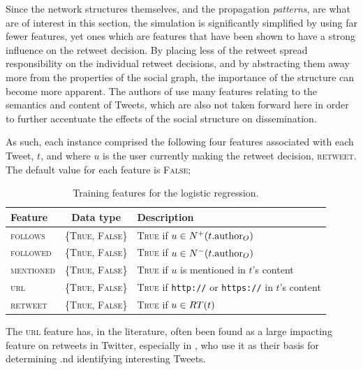 Since the network structures themselves, and the propagation \textit{patterns}, are what are of interest in this section, the simulation is significantly simplified by using far fewer features, yet ones which are features that have been shown to have a strong influence on the retweet decision. By placing less of the retweet spread responsibility on the individual retweet decisions, and by abstracting them away more from the properties of the social graph, the importance of the structure can become more apparent. The authors of \cite{zhu11} use many features relating to the semantics and content of Tweets, which are also not taken forward here in order to further accentuate the effects of the social structure on dissemination.

As such, each instance comprised the following four features associated with each Tweet, $t$, and where $u$ is the user currently making the retweet decision, \textsc{retweet}. The default value for each feature is \textsc{False};

\begin{table}[h]\footnotesize
\begin{center}
\begin{tabular}{ l | c | l }
	Feature & Data type & Description\\
	\hline
	\hline 
	\textsc{follows}    & \{\textsc{True, False}\} & \textsc{True} if $u \in N^+(t.\textrm{author}_O)$\\
    \textsc{followed}   & \{\textsc{True, False}\} & \textsc{True} if $u \in N^-(t.\textrm{author}_O)$\\
    \textsc{mentioned}  & \{\textsc{True, False}\} & \textsc{True} if $u$ is mentioned in $t$'s content\\
    \textsc{url}        & \{\textsc{True, False}\} & \textsc{True} if \texttt{http://} or \texttt{https://} in $t$'s content\\
    \hline 
    \textsc{retweet}    & \{\textsc{True, False}\} & \textsc{True} if $u \in RT(t)$\\ 
    \hline
\end{tabular}
\end{center}
\caption{Training features for the logistic regression.}
\label{table:logisticregressionfeatures}
\end{table}

The \textsc{url} feature has, in the literature, often been found as a large impacting feature on retweets in Twitter, especially in \cite{alonso10}, who use it as their basis for determining .nd identifying interesting Tweets.


